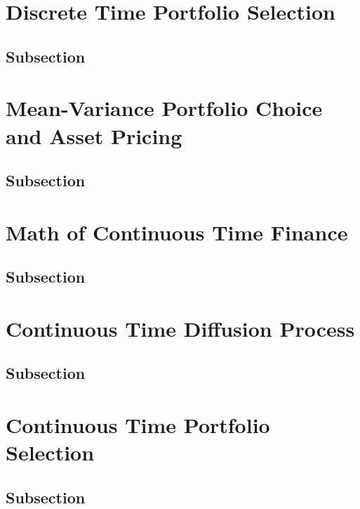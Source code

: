 \documentclass[
14pt,notheorems,hyperref={pdfauthor=whatever}
]{beamer}
\begin{document}
\section{Discrete Time Portfolio Selection}
\subsection{Subsection}

\section{Mean-Variance Portfolio Choice and Asset Pricing}
\subsection{Subsection}

\section{Math of Continuous Time Finance}
\subsection{Subsection}

\section{Continuous Time Diffusion Process}
\subsection{Subsection}

\section{Continuous Time Portfolio Selection}
\subsection{Subsection}
\end{document}
